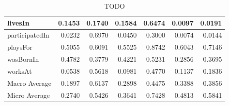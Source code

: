 \begin{table}[htbp]
\begin{tabular}{|l|r|r|r|r|r|r|}
livesIn & 0.1453 & 0.1740 & 0.1584 & 0.6474 & 0.0097 & 0.0191 \\ \hline
participatedIn & 0.0232 & 0.6970 & 0.0450 & 0.3000 & 0.0074 & 0.0144 \\ \hline
playsFor & 0.5055 & 0.6091 & 0.5525 & 0.8742 & 0.6043 & 0.7146 \\ \hline
wasBornIn & 0.4782 & 0.3779 & 0.4221 & 0.5231 & 0.2856 & 0.3695 \\ \hline
worksAt & 0.0538 & 0.5618 & 0.0981 & 0.4770 & 0.1137 & 0.1836 \\ \hline
Macro Average & 0.1897 & 0.6137 & 0.2898 & 0.4475 & 0.3388 & 0.3856 \\ \hline
Micro Average & 0.2740 & 0.5426 & 0.3641 & 0.7428 & 0.4813 & 0.5841 \\ \hline
\end{tabular}
\caption{TODO}
\label{t:nbc}
\end{table}

